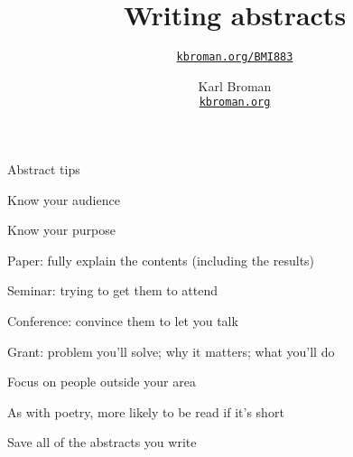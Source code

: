 \documentclass[aspectratio=169,12pt,t]{beamer}
\title{Writing abstracts}
\subtitle{}
\author{\href{https://kbroman.org/BMI883}{\tt kbroman.org/BMI883} }
\institute{}
\date{\small \hspace{3in} Karl Broman \\
  \hspace{3in} \href{https://kbroman.org}{\color{foreground}
    \small \tt kbroman.org}}
\begin{document}
{

\begin{frame}{Abstract tips}

  \bi
\item Know your audience
\item Know your purpose
  \bi
\item Paper: fully explain the contents (including the results)
\item Seminar: trying to get them to attend
\item Conference: convince them to let you talk
\item Grant: problem you'll solve; why it matters; what you'll do
   \ei
\item Focus on people outside your area
\item As with poetry, more likely to be read if it's short
\item Save all of the abstracts you write
  \ei

\end{frame}
}
\end{document}
